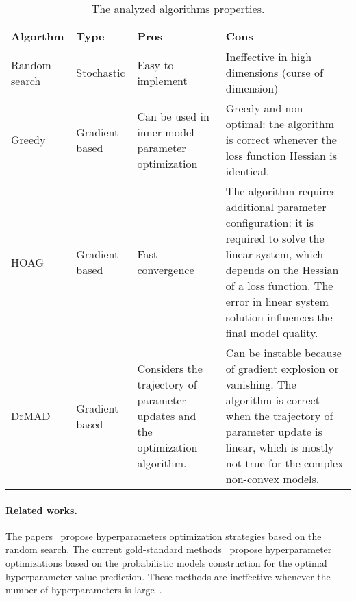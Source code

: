 \documentclass[smallextended]{svjour3}
\begin{document}
\begin{table}
\footnotesize

\begin{tabularx}{\textwidth}{|p{2cm}|p{2cm}|X|X|}
\hline
\bf Algorthm & \bf Type  & \bf Pros & \bf Cons  \\ \hline
Random search & Stochastic & Easy to implement & Ineffective in high dimensions (curse of dimension)\\ \hline
Greedy~\cite{hyper_greed} & Gradient-based & Can be used in inner model parameter optimization& Greedy and non-optimal: the algorithm is correct whenever the loss function Hessian is identical. \\ \hline
HOAG~\cite{hyper_hoag} & Gradient-based & Fast convergence & The algorithm requires additional parameter configuration: it is required to solve the linear system, which depends on the Hessian of a loss function. The error in linear system solution influences the final model quality.\\ \hline 
DrMAD~\cite{hyper_mad} & Gradient-based & Considers the trajectory of parameter updates and the optimization algorithm.& Can be instable because of gradient explosion or vanishing. The algorithm is correct when the trajectory of parameter update is linear, which is mostly not true for the complex non-convex models. \\ \hline
\end{tabularx}

\caption{The analyzed algorithms properties.}
\label{table:algo_descr}

\end{table}


\paragraph{Related works.}
The papers~\cite{random1,random2} propose hyperparameters optimization strategies based on the random search. The current gold-standard methods~\cite{probopt1,probopt2}   propose hyperparameter optimizations based on the probabilistic models construction for the optimal hyperparameter value prediction. These methods are  ineffective whenever the number of hyperparameters is large~\cite{hyper}.
\end{document}
